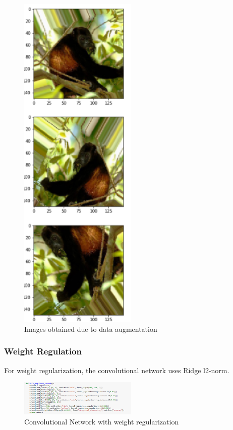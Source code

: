 \documentclass[a4paper,10pt]{article}
\begin{document}
   \begin{figure}[!htbp]
  	\centering
  	\includegraphics[width=0.5\textwidth]{augmentimg.png}
  	\caption{Images obtained due to data augmentation}
  \end{figure}
  \vspace{5mm} %
  
  \subsubsection{Weight Regulation}
  \quad For weight regularization, the convolutional network uses Ridge l2-norm. 
  
  \begin{figure}[!htbp]
  	\centering
  	\includegraphics[width=0.5\textwidth]{regulated.png}
  	\caption{Convolutional Network with weight regularization}
  \end{figure}
  \vspace{5mm} %
  
\end{document}
